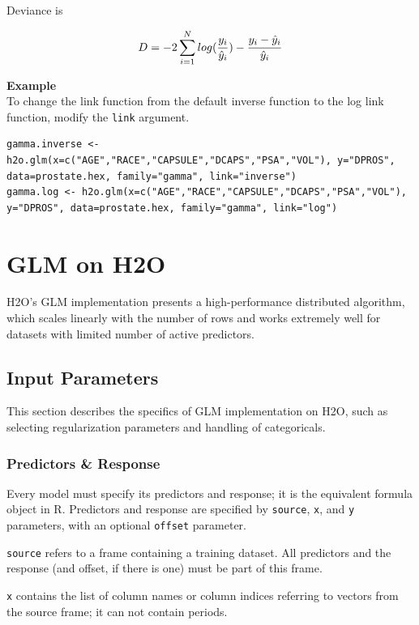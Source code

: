 \documentclass[11pt]{article}
\begin{document}
Deviance is 

\[D = -2\sum\limits_{i=1}\limits^{N}{log({y_i \over \hat{y}_i}) - {y_i - \hat{y}_i \over\hat{y}_i }}\]


\textbf{Example}\\

To change the link function from the default inverse function to the log link function, modify the \texttt{link} argument.

\begin{lstlisting}[style=R]
gamma.inverse <- h2o.glm(x=c("AGE","RACE","CAPSULE","DCAPS","PSA","VOL"), y="DPROS", data=prostate.hex, family="gamma", link="inverse")
gamma.log <- h2o.glm(x=c("AGE","RACE","CAPSULE","DCAPS","PSA","VOL"), y="DPROS", data=prostate.hex, family="gamma", link="log")
\end{lstlisting}


\section{GLM on H2O}
H2O's GLM implementation presents a high-performance distributed algorithm, which scales linearly with the number of rows and works extremely well for datasets with limited number of active predictors. 

\subsection{Input Parameters}
This section describes the specifics of GLM implementation on H2O, such as selecting regularization parameters and handling of categoricals. 

\subsubsection{Predictors \& Response}
Every model must specify its predictors and response; it is the equivalent formula object in R. Predictors and response are specified by \texttt{source}, \texttt{x}, and \texttt{y} parameters, with an optional \texttt{offset} parameter. 

\texttt{source} refers to a frame containing a training dataset. All predictors and the response (and offset, if there is one) must be part of this frame.

\texttt{x} contains the list of column names or column indices referring to vectors from the source frame; it can not contain periods.
\end{document}
